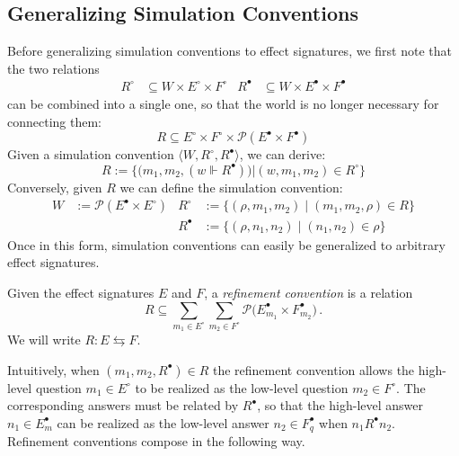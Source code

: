 \documentclass[sigplan,10pt,review,anonymous]{acmart}
\newcommand{\que}{{\circ}}
\newcommand{\ans}{{\bullet}}
\begin{document}

\subsection{Generalizing Simulation Conventions}

Before generalizing simulation conventions to effect signatures,
we first note that the two relations
\begin{align*}
  R^\que &\subseteq W \times E^\que \times F^\que &
  R^\ans &\subseteq W \times E^\ans \times F^\ans
\end{align*}
can be combined into a single one,
so that the world is no longer necessary for connecting them:
\[
  R \subseteq E^\que \times F^\que \times
    \mathcal{P}(E^\ans \times F^\ans)
\]
Given a simulation convention $\langle W, R^\que, R^\ans \rangle$,
we can derive:
\[
  R := \big\{
    \big(m_1, m_2, (w \Vdash R^\ans) \big)
    \mathrel{\big|} (w, m_1, m_2) \in R^\que \big\}
\]
Conversely, given $R$ we can define the simulation convention:
\begin{align*}
  W &:= \mathcal{P}(E^\ans \times E^\que) &
  R^\que &:= \{ (\rho, m_1, m_2) \mid (m_1, m_2, \rho) \in R \} \\&&
  R^\ans &:= \{ (\rho, n_1, n_2) \mid (n_1, n_2) \in \rho \}
\end{align*}
Once in this form,
simulation conventions
can easily be generalized to arbitrary effect signatures.

\begin{definition}
Given the effect signatures $E$ and $F$,
a \emph{refinement convention} is a relation
\[
  R \subseteq
    \sum_{m_1 \in E^\que} \sum_{m_2 \in F^\que}
    \mathcal{P} \big( E^\ans_{m_1} \times F^\ans_{m_2} \big) \,.
\]
We will write $R : E \leftrightarrows F$.
\end{definition}

Intuitively,
when $(m_1, m_2, R^\ans) \in R$
the refinement convention allows
the high-level question $m_1 \in E^\que$ to be realized as
the low-level question $m_2 \in F^\que$.
The corresponding answers must be related by $R^\ans$, so that
the high-level answer $n_1 \in E^\ans_m$ can be realized as
the low-level answer $n_2 \in F^\ans_q$ when $n_1 \mathrel{R^\ans} n_2$.
Refinement conventions compose in the following way.
\end{document}
